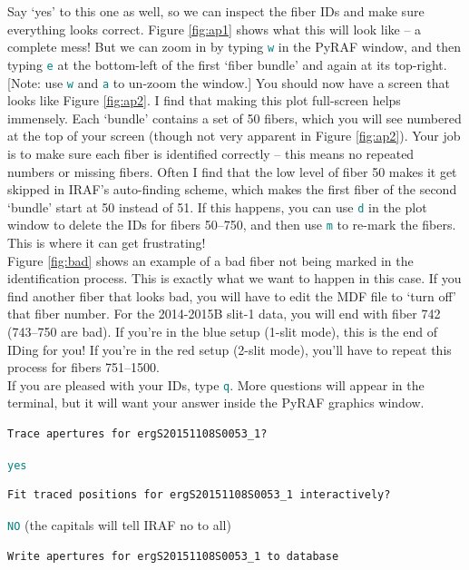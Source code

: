 \documentclass[12pt]{report}
\newcommand{\ty}[1]{\textcolor{teal}{\texttt{#1}}}
\begin{document}
\begin{enumerate}
Say `yes' to this one as well, so we can inspect the fiber IDs and make sure everything looks correct. Figure \ref{fig:ap1} shows what this will look like -- a complete mess! But we can zoom in by typing \ty{w} in the PyRAF window, and then typing \ty{e} at the bottom-left of the first `fiber bundle' and again at its top-right. [Note: use \ty{w} and \ty{a} to un-zoom the window.] You should now have a screen that looks like Figure \ref{fig:ap2}. I find that making this plot full-screen helps immensely. Each `bundle' contains a set of 50 fibers, which you will see numbered at the top of your screen (though not very apparent in Figure \ref{fig:ap2}). Your job is to make sure each fiber is identified correctly -- this means no repeated numbers or missing fibers. Often I find that the low level of fiber 50 makes it get skipped in IRAF's auto-finding scheme, which makes the first fiber of the second `bundle' start at 50 instead of 51. If this happens, you can use \ty{d} in the plot window to delete the IDs for fibers 50--750, and then use \ty{m} to re-mark the fibers. This is where it can get frustrating! \\

Figure \ref{fig:bad} shows an example of a bad fiber not being marked in the identification process. This is exactly what we want to happen in this case. If you find another fiber that looks bad, you will have to edit the MDF file to `turn off' that fiber number. For the 2014-2015B slit-1 data, you will end with fiber 742 (743--750 are bad). If you're in the blue setup (1-slit mode), this is the end of IDing for you! If you're in the red setup (2-slit mode), you'll have to repeat this process for fibers 751--1500. \\


If you are pleased with your IDs, type \ty{q}. More questions will appear in the terminal, but it will want your answer inside the PyRAF graphics window.

\begin{verbatim}
Trace apertures for ergS20151108S0053_1? 
\end{verbatim}

\ty{yes}

\begin{verbatim}
Fit traced positions for ergS20151108S0053_1 interactively?
\end{verbatim}

\ty{NO} (the capitals will tell IRAF no to all)

\begin{verbatim}
Write apertures for ergS20151108S0053_1 to database
\end{verbatim}


\end{enumerate}
\end{document}
